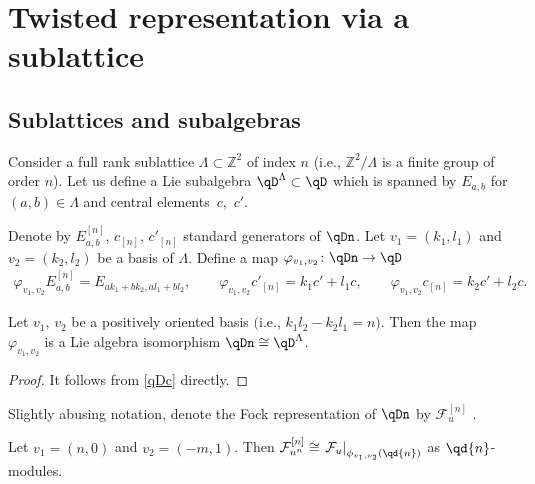 \section{Twisted representation via a sublattice}\label{S:sublattice}

\subsection{Sublattices and subalgebras}

Consider a full rank sublattice $\Lambda \subset \mathbb{Z}^2$ of index $n$ (i.e., $\mathbb{Z}^2/\Lambda$ is a finite group of order $n$). Let us define a Lie subalgebra $\qD^{\Lambda} \subset \qD$ which is spanned by $E_{a,b}$ for $(a,b) \in \Lambda$ and central elements~$c$,~$c'$.

Denote by $E_{a,b}^{[n]}$, $c_{[n]}$, $c'_{[n]}$ standard generators of $\qDn$. Let $v_1 = (k_1, l_1)$ and $v_2 = (k_2, l_2)$ be a basis of $\Lambda$. Define a map $\varphi_{v_1, v_2}\colon \qDn \rightarrow \qD$
\begin{gather*}
\varphi_{v_1, v_2} E^{\scriptstyle{[n]}}_{a,b} = E_{a k_1 + b k_2, a l_1 + b l_2}, \qquad
\varphi_{v_1, v_2} c'_{\scriptstyle{[n]}} = k_1 c' + l_1 c, \qquad
\varphi_{v_1, v_2} c_{\scriptstyle{[n]}} = k_2 c' + l_2 c.
\end{gather*}

\begin{Proposition}
Let $v_1$, $v_2$ be a positively oriented basis $($i.e., $k_1 l_2 - k_2 l_1 =n)$. Then the map~$\varphi_{v_1, v_2}$ is a Lie algebra isomorphism $\qDn \cong \qD^{\Lambda}$.
\end{Proposition}

\begin{proof}It follows from \eqref{qDc} directly.
\end{proof}

Slightly abusing notation, denote the Fock representation of $\qDn$ by $\mathcal{F}_u^{[n]}$ .

\begin{Proposition} \label{LambdaFock}
Let $v_1 = (n,0)$ and $v_2 =(-m, 1)$. Then $ \mathcal{F}_{u^{n}}^{[n]} \cong \left. \mathcal{F}_u \right|_{\phi_{v_1, v_2} \left(\qd{n} \right)}$ as $\qd{n}$-modules.
\end{Proposition}

